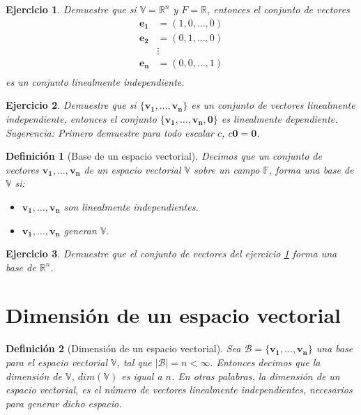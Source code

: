\documentclass[11pt]{report}
\theoremstyle{break}
\newtheorem{definicion}{Definición}[chapter]
\newtheorem{ejercicio}{Ejercicio}[chapter]
\theoremstyle{break}
\newcommand{\mbb}[1]{$\mathbb{#1}$}
\begin{document}
\begin{ejercicio}
\label{ejercicio:Base-e}
Demuestre que si $ \mathbb{V} = \mathbb{R}^n$ y $F = \mathbb{R}$, entonces el conjunto de vectores
\begin{align*}
\bm{e_1} & =  (1,0,\ldots,0) \nonumber \\ 
\bm{e_2} & =  (0,1,\ldots,0) \nonumber \\
 & \vdots  \nonumber \\
\bm{e_n} & =  (0,0,\ldots,1) \nonumber \\ 
\end{align*}
es un conjunto linealmente independiente.
\end{ejercicio}

\begin{ejercicio}
Demuestre que si $\{ \bm{v_1}, \ldots, \bm{v_n} \}$ es un conjunto de vectores linealmente independiente, entonces el conjunto $\{ \bm{v_1}, \ldots, \bm{v_n}, \bm{0} \}$ es linealmente dependiente.
Sugerencia: Primero demuestre para todo escalar $c$, $c\bm{0} = \bm{0}$.
\end{ejercicio}

\begin{definicion}[Base de un espacio vectorial]
\label{definicion:base-de-un-espacio-vectorial}
Decimos que un conjunto de vectores $\bm{v_1}, \ldots, \bm{v_n}$ de un espacio vectorial \mbb{V} sobre un campo \mbb{F}, forma una base de \mbb{V} si:

\begin{itemize}
\item $\bm{v_1}, \ldots, \bm{v_n}$ son linealmente independientes.
\item $\bm{v_1}, \ldots, \bm{v_n}$ generan \mbb{V}.
\end{itemize}
\end{definicion}

\begin{ejercicio}
Demuestre que el conjunto de vectores del ejercicio \ref{ejercicio:Base-e} forma una base de $\mathbb{R}^n$.
\end{ejercicio}

\section{Dimensión de un espacio vectorial}
\label{seccion:dimension-espacio}
\begin{definicion}[Dimensión de un espacio vectorial]
\label{definicion:dimension-espacio}
Sea $\mathcal{B} = \{\bm{v_1},\ldots, \bm{v_n}  \}$ una base para el espacio vectorial \mbb{V}, tal que $\left| \mathcal{B} \right| = n < \infty$. Entonces decimos que la dimensión de \mbb{V}, $dim(\mathbb{V})$ es igual a $n$. En otras palabras, la dimensión de un espacio vectorial, es el número de vectores linealmente independientes, necesarios para generar dicho espacio.
\end{definicion}
\end{document}
